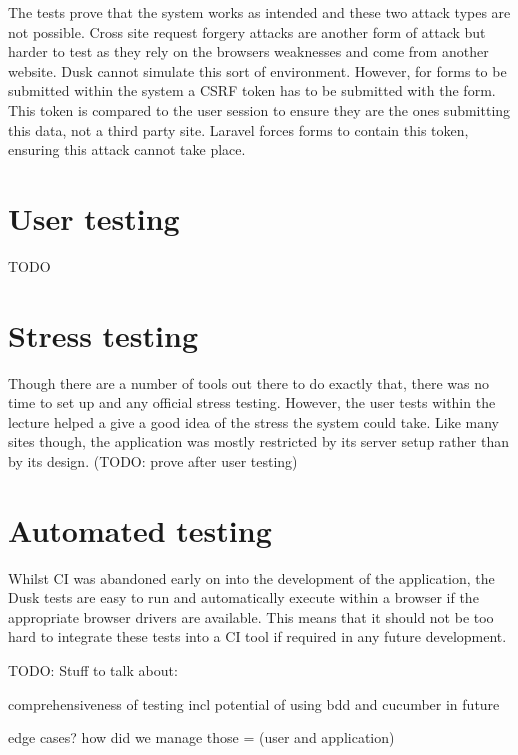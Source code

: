 The tests prove that the system works as intended and these two attack types are not possible. Cross site request forgery attacks are another form of attack but harder to test as they rely on the browsers weaknesses and come from another website. Dusk cannot simulate this sort of environment. However, for forms to be submitted within the system a CSRF token has to be submitted with the form. This token is compared to the user session to ensure they are the ones submitting this data, not a third party site. Laravel forces forms to contain this token, ensuring this attack cannot take place. 

\section{User testing}
TODO

\section{Stress testing}
Though there are a number of tools out there to do exactly that, there was no time to set up and any official stress testing. However, the user tests within the lecture helped a give a good idea of the stress the system could take. Like many sites though, the application was mostly restricted by its server setup rather than by its design. (TODO: prove after user testing)

\section{Automated testing}
Whilst CI was abandoned early on into the development of the application, the Dusk tests are easy to run and automatically execute within a browser if the appropriate browser drivers are available. This means that it should not be too hard to integrate these tests into a CI tool if required in any future development.


TODO: Stuff to talk about:

comprehensiveness of testing incl potential of using bdd and cucumber in future

edge cases? how did we manage those = (user and application)